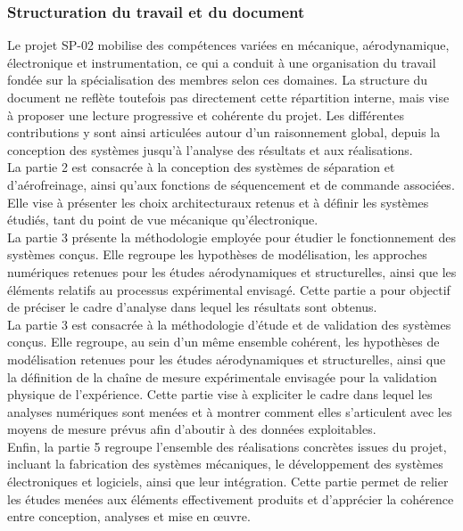 \subsubsection{Structuration du travail et du document}

Le projet SP-02 mobilise des compétences variées en mécanique, aérodynamique, électronique et instrumentation, ce qui a conduit
à une organisation du travail fondée sur la spécialisation des membres selon ces domaines. La structure du document ne reflète
toutefois pas directement cette répartition interne, mais vise à proposer une lecture progressive et cohérente du projet. Les
différentes contributions y sont ainsi articulées autour d’un raisonnement global, depuis la conception des systèmes jusqu’à
l’analyse des résultats et aux réalisations.\\

La partie 2 est consacrée à la conception des systèmes de séparation et d’aérofreinage, ainsi qu’aux fonctions de séquencement
et de commande associées. Elle vise à présenter les choix architecturaux retenus et à définir les systèmes étudiés, tant du
point de vue mécanique qu’électronique.\\

La partie 3 présente la méthodologie employée pour étudier le fonctionnement des systèmes conçus. Elle regroupe les hypothèses
de modélisation, les approches numériques retenues pour les études aérodynamiques et structurelles, ainsi que les éléments
relatifs au processus expérimental envisagé. Cette partie a pour objectif de préciser le cadre d’analyse dans lequel les
résultats sont obtenus.\\

La partie 3 est consacrée à la méthodologie d’étude et de validation des systèmes conçus. Elle regroupe, au sein d’un même
ensemble cohérent, les hypothèses de modélisation retenues pour les études aérodynamiques et structurelles, ainsi que la
définition de la chaîne de mesure expérimentale envisagée pour la validation physique de l’expérience. Cette partie vise à
expliciter le cadre dans lequel les analyses numériques sont menées et à montrer comment elles s’articulent avec les moyens de
mesure prévus afin d’aboutir à des données exploitables.\\

Enfin, la partie 5 regroupe l’ensemble des réalisations concrètes issues du projet, incluant la fabrication des systèmes
mécaniques, le développement des systèmes électroniques et logiciels, ainsi que leur intégration. Cette partie permet de relier
les études menées aux éléments effectivement produits et d’apprécier la cohérence entre conception, analyses et mise en œuvre.\\

